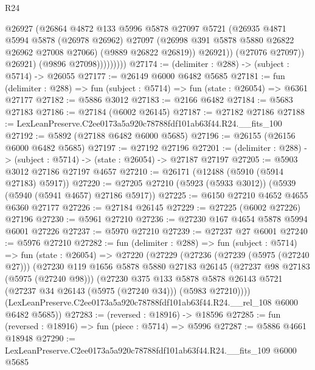 \begin{lexlean}{R24}
\begin{coremodule}
                          @26927
                          (@26864
                            @4872
                            @133
                            @5996
                            @5878
                            @27097
                            @5721
                            (@26935
                              @4871
                              @5994
                              @5878
                              (@26978 @26962)
                              @27097
                              (@26998 @391 @5878 @5880 @26822 @26962 @27008 @27066)
                              (@9889 @26822 @26819))
                            @26921))
                        (@27076 @27097))
                      @26921)
                    (@9896 @27098)))))))))
@27174 := (delimiter : @288) -> (subject : @5714) -> @26055
@27177 := @26149 @6000 @6482 @5685
@27181 := fun (delimiter : @288) => fun (subject : @5714) => fun (state : @26054) => @6361 @27177
@27182 := @5886 @3012
@27183 := @2166 @6482
@27184 := @5683 @27183
@27186 := @27184 (@6002 @26145)
@27187 := @27182 @27186
@27188 := LexLeanPreserve.C2ee0173a5a920c78788fdf101ab63f44.R24.__fits_100
@27192 := @5892 (@27188 @6482 @6000 @5685)
@27196 := @26155 (@26156 @6000 @6482 @5685)
@27197 := @27192 @27196
@27201 := (delimiter : @288) -> (subject : @5714) -> (state : @26054) -> @27187 @27197
@27205 := @5903 @3012 @27186 @27197 @4657
@27210 := @26171 (@12488 (@5910 (@5914 @27183) @5917))
@27220 := @27205 @27210 (@5923 (@5933 @3012)) (@5939 (@5940 (@5941 @4657) @27186 @5917))
@27225 := @6150 @27210 @4652 @4655 @6360 @27177
@27226 := @27184 @26145
@27229 := @27225 (@6002 @27226) @27196
@27230 := @5961 @27210
@27236 := @27230 @167 @4654 @5878 @5994 @6001 @27226
@27237 := @5970 @27210
@27239 := @27237 @27 @6001
@27240 := @5976 @27210
@27282 := fun (delimiter : @288) =>
  fun (subject : @5714) =>
  fun (state : @26054) =>
  @27220
    (@27229
      (@27236
        (@27239 (@5975 (@27240 @27)))
        (@27230
          @119
          @1656
          @5878
          @5880
          @27183
          @26145
          (@27237 @98 @27183 (@5975 (@27240 @98)))
          (@27230
            @375
            @133
            @5878
            @5878
            @26143
            @5721
            (@27237 @34 @26143 (@5975 (@27240 @34)))
            (@5983 @27210))))
      (LexLeanPreserve.C2ee0173a5a920c78788fdf101ab63f44.R24.__rel_108 @6000 @6482 @5685))
@27283 := (reversed : @18916) -> @18596
@27285 := fun (reversed : @18916) => fun (piece : @5714) => @5996
@27287 := @5886 @4661 @18948
@27290 := LexLeanPreserve.C2ee0173a5a920c78788fdf101ab63f44.R24.__fits_109 @6000 @5685

\end{coremodule}
\end{lexlean}
